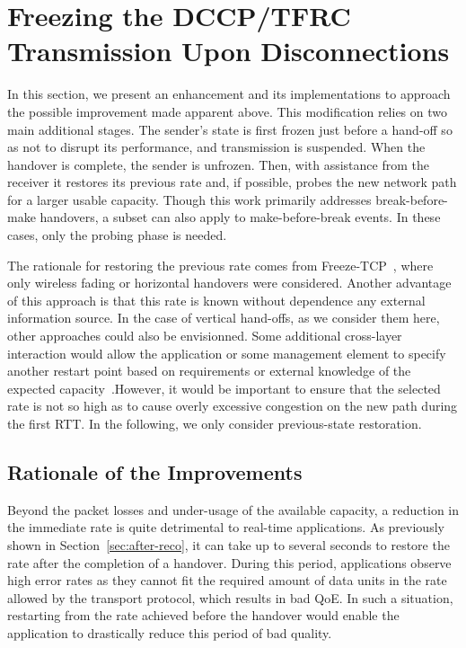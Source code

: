 \documentclass[twocolumn]{nictatechreport}
\newcommand{\latinlocution}[1]{\textit{#1}}
\newcommand{\eg}{\latinlocution{e.g.}}
\begin{document}
\section{Freezing the DCCP/TFRC Transmission Upon Disconnections}
\label{freezetfrc:freezing}

In this section, we present an enhancement and its implementations to approach
the possible improvement made apparent above.  This modification relies on two
main additional stages. The sender's state is first frozen just before a
hand-off so as not to disrupt its performance, and transmission is suspended.
When the handover is complete, the sender is unfrozen. Then, with assistance
from the receiver it restores its previous rate and, if possible, probes the new
network path for a larger usable capacity.  Though this work primarily addresses
break-before-make handovers, a subset can also apply to make-before-break
events. In these cases, only the probing phase is needed.

The rationale for restoring the previous rate comes from
Freeze-TCP~\cite{2000goff_freezetcp}, where only wireless fading or horizontal
handovers were considered. Another advantage of this approach is that this rate
is known without dependence any external information source. In the case of
vertical hand-offs, as we consider them here, other approaches could also be
envisionned.  Some additional cross-layer interaction would allow the
application or some management element to specify another restart point based on
requirements or external knowledge of the expected
capacity~\cite[\eg,][]{1999balakrishnan_integrated_congestion_control,2011mehani_multihomed_flow_management}.However, it would be important to ensure that the selected rate is not so high
as to cause overly excessive congestion on the new path during the first RTT.
In the following, we only consider previous-state restoration.

\subsection{Rationale of the Improvements}

Beyond the packet losses and under-usage of the available capacity, a reduction
in the immediate rate is quite detrimental to real-time applications. As
previously shown in Section~\ref{sec:after-reco}, it can take
up to several seconds to restore the rate after the completion of a handover.
During this period, applications observe high error rates as they cannot fit the
required amount of data units in the rate allowed by the transport protocol,
which results in bad QoE.  In such a situation, restarting from the rate
achieved before the handover would enable the application to drastically reduce
this period of bad quality.
\end{document}

